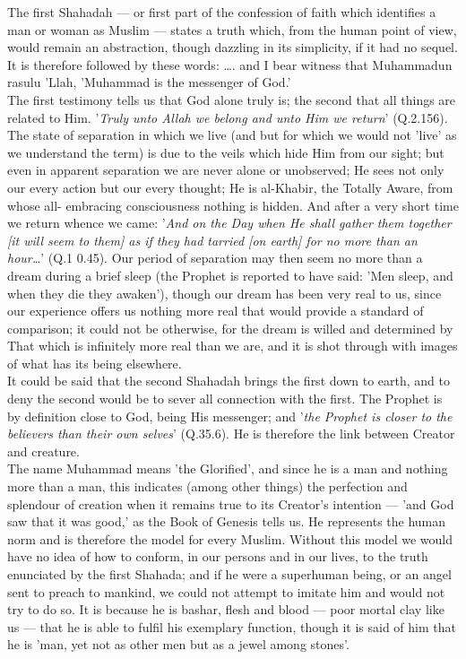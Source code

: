 \documentclass[10pt, twoside,openright]{book}
\begin{document}
The first Shahadah --- or first part of the confession of faith which identifies a man or woman as 
Muslim --- states a truth which, from the human point of view, would remain an abstraction, though 
dazzling in its simplicity, if it had no sequel. It is therefore followed by these words: \ldots{}. and I 
bear witness that Muhammadun rasulu 'Llah, 'Muhammad is the messenger of God.' \\

The first testimony tells us that God alone truly is; the second that all things are related to Him. 
'\emph{Truly unto Allah we belong and unto Him we return}' (Q.2.156). The state of separation in which we live (and but for which we would not 'live' as we understand the term) is due to the veils which hide 
Him from our sight; but even in apparent separation we are never alone or unobserved; He sees not 
only our every action but our every thought; He is al\hyp{}Khabir, the Totally Aware, from whose all\hyp{}
embracing consciousness nothing is hidden. And after a very short time we return whence we came: '\emph{And on the Day when He shall gather them together [it will seem to them] as if they had tarried [on earth] for no more than an hour\ldots{}}' (Q.1 0.45). Our period of separation may then seem no more than a dream during a brief sleep (the Prophet is reported to have said: 'Men sleep, and when they die they awaken'), though our dream has been very real to us, since our experience offers us nothing more real that would provide a standard of comparison; it could not be otherwise, for the dream is willed and determined by That which is infinitely more real than we are, and it is shot through with images of 
what has its being elsewhere. \\

It could be said that the second Shahadah brings the first down to earth, and to deny the second 
would be to sever all connection with the first. The Prophet is by definition close to God, being His 
messenger; and '\emph{the Prophet is closer to the believers than their own selves}' (Q.35.6). He is 
therefore the link between Creator and creature. \\

The name Muhammad means 'the Glorified', and since he is a man and nothing more than a man, this 
indicates (among other things) the perfection and splendour of creation when it remains true to its 
Creator's intention --- 'and God saw that it was good,' as the Book of Genesis tells us. He represents 
the human norm and is therefore the model for every Muslim. Without this model we would have no idea 
of how to conform, in our persons and in our lives, to the truth enunciated by the first Shahada; 
and if he were a superhuman being, or an angel sent to preach to mankind, we could not attempt to 
imitate him and would not try to do so. It is because he is bashar, flesh and blood --- poor mortal 
clay like us --- that he is able to fulfil his exemplary function, though it is said of him that he is 
'man, yet not as other men but as a jewel among stones'. \\
\end{document}
